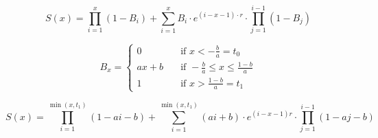\documentclass{article}
\begin{document}
\begin{equation}
S(x) = \prod_{i=1}^x (1-B_i) + \sum_{i=1}^x B_i \cdot e^{(i-x-1)\cdot r} \cdot \prod_{j=1}^{i-1} (1-B_j)
\end{equation}

\[ B_x = 
   \begin{cases}
      0 & \quad \text{if } x < -\frac{b}{a} = t_0\\
      ax + b & \quad \text{if } -\frac{b}{a} \leq x \leq \frac{1-b}{a}\\
      1 & \quad \text{if } x > \frac{1-b}{a} = t_1
   \end{cases}
\]

\begin{equation}
S(x) = \prod_{i=1}^{\min(x, t_1)} (1 - ai - b) + \sum_{i=1}^{\min(x,t_1)} (ai+b)\cdot e^{(i-x-1)r} \cdot \prod_{j=1}^{i-1}(1-aj-b)
\end{equation}
\end{document}

